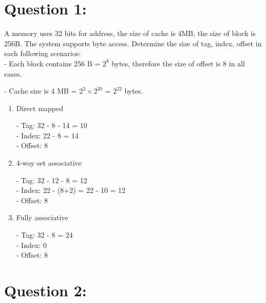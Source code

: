 \documentclass[12pt,a4paper]{article}
\begin{document}
\begin{titlepage}
\begin{center}
\begin{minipage}{0.4\textwidth}
\begin{flushright}
      \end{flushright}
    \end{minipage}

    \vfill

    \vspace{2cm}
    {\large} %
  \end{center}
\end{titlepage}


\section*{Question 1:}

A memory uses 32 bits for address, the size of cache is 4MB, the size of block is 256B. The system supports byte access. Determine the size of tag, index, offset in each following scenarios: \\

- Each block contains 256 B = $2^8$ bytes, therefore the size of offset is 8 in all cases.

- Cache size is 4 MB = $2^2 \times 2^{20}$ = $2^{22}$ bytes.


\begin{enumerate}
  \item Direct mapped

        - Tag: 32 - 8 - 14 = 10 \\
        - Index: 22 - 8 = 14 \\
        - Offset: 8 \\

  \item 4-way set associative

        - Tag: 32 - 12 - 8 = 12 \\
        - Index: 22 - (8+2) = 22 - 10 = 12\\
        - Offset: 8

  \item Fully associative

        - Tag: 32 - 8 = 24\\
        - Index: 0\\
        - Offset: 8

\end{enumerate}



\section*{Question 2:}
\end{document}
